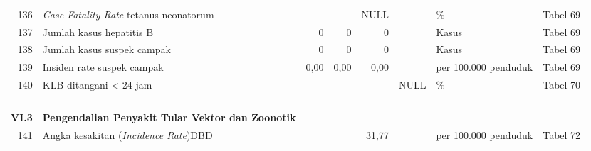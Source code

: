 \begin{small}
\begin{longtable}{rY{12em}rrrrY{5em}Y{5em}}
	136 & \emph{Case Fatality Rate} tetanus neonatorum                                          &        &        &    NULL &                   & \%                             & Tabel 69 \\
	                  137 & Jumlah kasus hepatitis B                                                              &      0 &      0 &       0 &                   & Kasus                          & Tabel 69 \\
	138 & Jumlah kasus suspek campak                                                            &      0 &      0 &       0 &                   & Kasus                          & Tabel 69 \\
	                  139 & Insiden rate suspek campak                                                            &   0,00 &   0,00 &    0,00 &                   & per 100.000 penduduk           & Tabel 69 \\
	140 & KLB ditangani < 24 jam                                                                &        &        &         &              NULL & \%                             & Tabel 70 \\
	                      &                                                                                       &        &        &         &                   &                                &          \\
	                      &                                                                                       &        &        &         &                   &                                &          \\
	                      &                                                                                       &        &        &         &                   &                                &		  \\				  
	                      &                                                                                       &        &        &         &                   &                                &		  \\
	        \textbf{VI.3} & \textbf{Pengendalian Penyakit Tular Vektor dan Zoonotik}                              &        &        &         &                   &                                &          \\
	                  141 & Angka kesakitan (\emph{Incidence Rate})DBD                                            &        &        &   31,77 &                   & per 100.000 penduduk           & Tabel 72 \\

\end{longtable}
\end{small}
